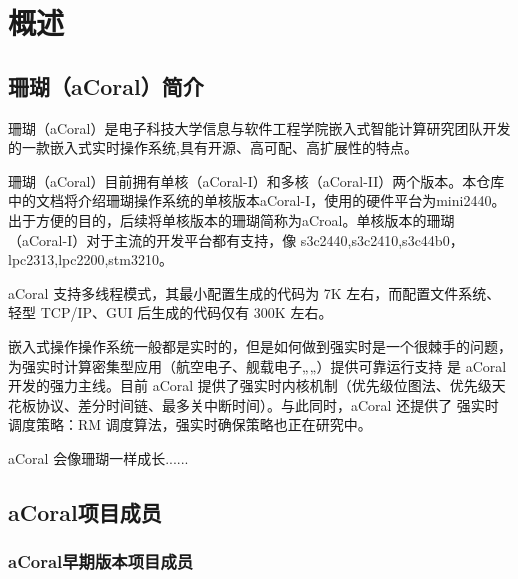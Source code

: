 \chapter{概述}

\section{珊瑚（aCoral）简介}

珊瑚（aCoral）是电子科技大学信息与软件工程学院嵌入式智能计算研究团队开发的一款嵌入式实时操作系统,具有开源、高可配、高扩展性的特点。

珊瑚（aCoral）目前拥有单核（aCoral-I）和多核（aCoral-II）两个版本。本仓库中的文档将介绍珊瑚操作系统的单核版本aCoral-I，使用的硬件平台为mini2440。
出于方便的目的，后续将单核版本的珊瑚简称为aCroal。单核版本的珊瑚（aCoral-I）对于主流的开发平台都有支持，像 s3c2440,s3c2410,s3c44b0，lpc2313,lpc2200,stm3210。

aCoral 支持多线程模式，其最小配置生成的代码为 7K 左右，而配置文件系统、轻型 TCP/IP、GUI 后生成的代码仅有 300K 左右。

嵌入式操作操作系统一般都是实时的，但是如何做到强实时是一个很棘手的问题，为强实时计算密集型应用（航空电子、舰载电子„„）提供可靠运行支持
是 aCoral 开发的强力主线。目前 aCoral 提供了强实时内核机制（优先级位图法、优先级天花板协议、差分时间链、最多关中断时间）。与此同时，aCoral 还提供了
强实时调度策略：RM 调度算法，强实时确保策略也正在研究中。

aCoral 会像珊瑚一样成长......

\section{aCoral项目成员}
\subsection{aCoral早期版本项目成员}

